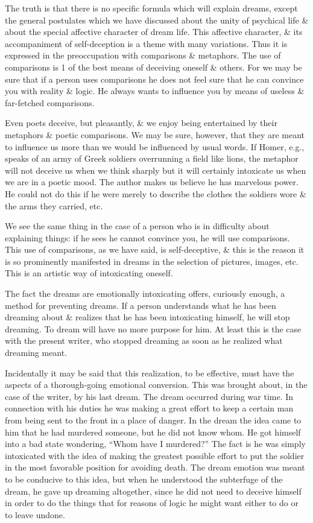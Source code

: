 \documentclass{article}
\numberwithin{equation}{section}
\begin{document}
The truth is that there is no specific formula which will explain dreams, except the general postulates which we have discussed about the unity of psychical life \& about the special affective character of dream life. This affective character, \& its accompaniment of self-deception is a theme with many variations. Thus it is expressed in the preoccupation with comparisons \& metaphors. The use of comparisons is 1 of the best means of deceiving oneself \& others. For we may be sure that if a person uses comparisons he does not feel sure that he can convince you with reality \& logic. He always wants to influence you by means of useless \& far-fetched comparisons.

Even poets deceive, but pleasantly, \& we enjoy being entertained by their metaphors \& poetic comparisons. We may be sure, however, that they are meant to influence us more than we would be influenced by usual words. If Homer, e.g., speaks of an army of Greek soldiers overrunning a field like lions, the metaphor will not deceive us when we think sharply but it will certainly intoxicate us when we are in a poetic mood. The author makes us believe he has marvelous power. He could not do this if he were merely to describe the clothes the soldiers wore \& the arms they carried, etc.

We see the same thing in the case of a person who is in difficulty about explaining things: if he sees he cannot convince you, he will use comparisons. This use of comparisons, as we have said, is self-deceptive, \& this is the reason it is so prominently manifested in dreams in the selection of pictures, images, etc. This is an artistic way of intoxicating oneself.

The fact the dreams are emotionally intoxicating offers, curiously enough, a method for preventing dreams. If a person understands what he has been dreaming about \& realizes that he has been intoxicating himself, he will stop dreaming. To dream will have no more purpose for him. At least this is the case with the present writer, who stopped dreaming as soon as he realized what dreaming meant.

Incidentally it may be said that this realization, to be effective, must have the aspects of a thorough-going emotional conversion. This was brought about, in the case of the writer, by his last dream. The dream occurred during war time. In connection with his duties he was making a great effort to keep a certain man from being sent to the front in a place of danger. In the dream the idea came to him that he had murdered someone, but he did not know whom. He got himself into a bad state wondering, ``Whom have I murdered?'' The fact is he was simply intoxicated with the idea of making the greatest possible effort to put the soldier in the most favorable position for avoiding death. The dream emotion was meant to be conducive to this idea, but when he understood the subterfuge of the dream, he gave up dreaming altogether, since he did not need to deceive himself in order to do the things that for reasons of logic he might want either to do or to leave undone.
\end{document}
